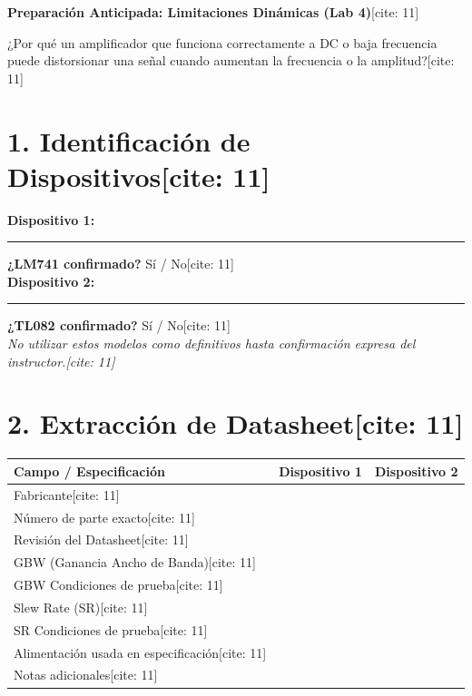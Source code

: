 \documentclass[11pt, a4paper]{article}
\begin{document}
\begin{center}
    \Large\textbf{\textcolor{ucbblue}{Preparación Anticipada: Limitaciones Dinámicas (Lab 4)}}[cite: 11]
\end{center}

\begin{tcolorbox}[colback=white, colframe=black, title=\textbf{Objetivo Experimental[cite: 11]}]
    ¿Por qué un amplificador que funciona correctamente a DC o baja frecuencia puede distorsionar una señal cuando aumentan la frecuencia o la amplitud?[cite: 11]
\end{tcolorbox}

\section*{1. Identificación de Dispositivos[cite: 11]}
\textbf{Dispositivo 1:} \rule{4cm}{0.4pt} \textbf{¿LM741 confirmado?} Sí / No[cite: 11] \\
\textbf{Dispositivo 2:} \rule{4cm}{0.4pt} \textbf{¿TL082 confirmado?} Sí / No[cite: 11] \\
\textit{No utilizar estos modelos como definitivos hasta confirmación expresa del instructor.[cite: 11]}

\section*{2. Extracción de Datasheet[cite: 11]}
\begin{table}[h]
    \centering
    \renewcommand{\arraystretch}{1.5}
    \begin{tabularx}{\textwidth}{|l|X|X|}
    \hline
    \textbf{Campo / Especificación} & \textbf{Dispositivo 1} & \textbf{Dispositivo 2} \\ \hline
    Fabricante[cite: 11] & & \\ \hline
    Número de parte exacto[cite: 11] & & \\ \hline
    Revisión del Datasheet[cite: 11] & & \\ \hline
    GBW (Ganancia Ancho de Banda)[cite: 11] & & \\ \hline
    GBW Condiciones de prueba[cite: 11] & & \\ \hline
    Slew Rate (SR)[cite: 11] & & \\ \hline
    SR Condiciones de prueba[cite: 11] & & \\ \hline
    Alimentación usada en especificación[cite: 11] & & \\ \hline
    Notas adicionales[cite: 11] & & \\ \hline
    \end{tabularx}
\end{table}
\end{document}
